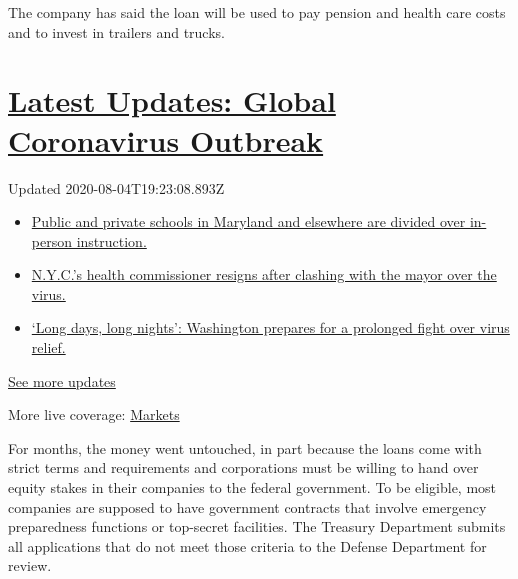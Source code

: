 The company has said the loan will be used to pay pension and health
care costs and to invest in trailers and trucks.

\hypertarget{latest-updates-global-coronavirus-outbreak}{%
\section{\texorpdfstring{\href{https://www.nytimes.com/2020/08/04/world/coronavirus-cases.html?action=click\&pgtype=Article\&state=default\&region=MAIN_CONTENT_1\&context=storylines_live_updates}{Latest
Updates: Global Coronavirus
Outbreak}}{Latest Updates: Global Coronavirus Outbreak}}\label{latest-updates-global-coronavirus-outbreak}}

Updated 2020-08-04T19:23:08.893Z

\begin{itemize}
\tightlist
\item
  \href{https://www.nytimes.com/2020/08/04/world/coronavirus-cases.html?action=click\&pgtype=Article\&state=default\&region=MAIN_CONTENT_1\&context=storylines_live_updates\#link-4825b93}{Public
  and private schools in Maryland and elsewhere are divided over
  in-person instruction.}
\item
  \href{https://www.nytimes.com/2020/08/04/world/coronavirus-cases.html?action=click\&pgtype=Article\&state=default\&region=MAIN_CONTENT_1\&context=storylines_live_updates\#link-4d1eafa8}{N.Y.C.'s
  health commissioner resigns after clashing with the mayor over the
  virus.}
\item
  \href{https://www.nytimes.com/2020/08/04/world/coronavirus-cases.html?action=click\&pgtype=Article\&state=default\&region=MAIN_CONTENT_1\&context=storylines_live_updates\#link-6b644638}{`Long
  days, long nights': Washington prepares for a prolonged fight over
  virus relief.}
\end{itemize}

\href{https://www.nytimes.com/2020/08/04/world/coronavirus-cases.html?action=click\&pgtype=Article\&state=default\&region=MAIN_CONTENT_1\&context=storylines_live_updates}{See
more updates}

More live coverage:
\href{https://www.nytimes.com/live/2020/08/04/business/stock-market-today-coronavirus?action=click\&pgtype=Article\&state=default\&region=MAIN_CONTENT_1\&context=storylines_live_updates}{Markets}

For months, the money went untouched, in part because the loans come
with strict terms and requirements and corporations must be willing to
hand over equity stakes in their companies to the federal government. To
be eligible, most companies are supposed to have government contracts
that involve emergency preparedness functions or top-secret facilities.
The Treasury Department submits all applications that do not meet those
criteria to the Defense Department for review.

